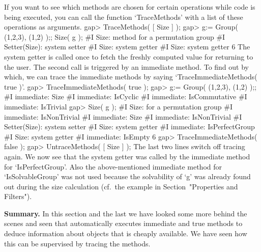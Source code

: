 %
If you want to see which methods  are chosen for certain operations while
{\GAP}  code is being executed,  you can call the function `TraceMethods'
with a list of these operations as arguments.
\beginexample
gap> TraceMethods( [ Size ] );
gap> g:= Group( (1,2,3), (1,2) );;  Size( g );
#I  Size: method for a permutation group
#I  Setter(Size): system setter
#I  Size: system getter
#I  Size: system getter
6
\endexample
The system getter is called once to fetch  the freshly computed value for
returning  to the user.  The  second  call is  triggered by  an immediate
method. To  find out  by which,  we can trace   the immediate  methods by
saying `TraceImmediateMethods( true )'.
\beginexample
gap> TraceImmediateMethods( true );
gap> g:= Group( (1,2,3), (1,2) );;
#I  immediate: Size
#I  immediate: IsCyclic
#I  immediate: IsCommutative
#I  immediate: IsTrivial
gap> Size( g );
#I  Size: for a permutation group
#I  immediate: IsNonTrivial
#I  immediate: Size
#I  immediate: IsNonTrivial
#I  Setter(Size): system setter
#I  Size: system getter
#I  immediate: IsPerfectGroup
#I  Size: system getter
#I  immediate: IsEmpty
6
gap> TraceImmediateMethods( false );
gap> UntraceMethods( [ Size ] );
\endexample
The last two lines switch off tracing  again. We now  see that the system
getter was called by the immediate method for `IsPerfectGroup'. 
Also the above-mentioned immediate method for `IsSolvableGroup'
was not used because the solvability of `g'  was already found out during
the size calculation
(cf.~the example in Section~"Properties and Filters").

{\bf Summary.}  In this section  and the  last we have  looked some  more
behind the  scenes and seen  that {\GAP} automatically executes immediate
and true  methods  to deduce  information about  objects  that is cheaply
available.  We  have seen how   this  can be  supervised  by tracing  the
methods.


